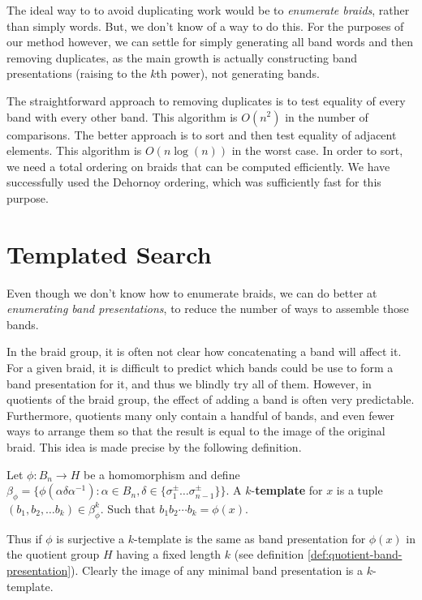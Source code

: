 \documentclass[12pt]{thesis}
\begin{document}
The ideal way to to avoid duplicating work would be to \textit{enumerate braids},
rather than simply words.
But, we don't know of a way to do this.
For the purposes of our method however, we can settle for simply
generating all band words and then removing duplicates, as the main growth is 
actually constructing band presentations (raising to the $k$th power), not generating bands.

The straightforward approach to removing duplicates is to test equality
of every band with every other band. 
This algorithm is $O(n^{2})$  in the number of comparisons.
The better approach is to sort and then test equality of adjacent elements.
This algorithm is $O(n \log(n))$ in the worst case.
In order to sort, we need a total ordering on braids that can be computed efficiently.
We have successfully used the Dehornoy ordering, which was sufficiently fast for this purpose.

\section{Templated Search}

Even though we don't know how to enumerate braids,
we can do better at \textit{enumerating band presentations},
to reduce the number of ways to assemble those bands.

In the braid group, it is often not clear how concatenating a band will affect it.
For a given braid, it is difficult to predict which bands could be use to form a band presentation for it,
and thus we blindly try all of them.
However, in quotients of the braid group, the effect of adding a band is often very predictable.
Furthermore, quotients many only contain a handful of bands,
and even fewer ways to arrange them so that the result is equal to the image of the original braid.
This idea is made precise by the following definition.

\begin{definition}
     Let $\phi \colon B_{n} \rightarrow H$ be a homomorphism
     and define $\beta_{\phi} = \{ \phi(\alpha \delta \alpha^{-1}) \colon \alpha \in B_{n}, \delta \in \{\sigma_{1}^{\pm} \ldots \sigma_{n-1}^{\pm} \} \}$.
     A $k$-\textbf{template} for $x$ 
     is a tuple $(b_{1}, b_{2}, \ldots b_{k}) \in \beta_{\phi}^{k}$.
     Such that $b_{1}b_{2} \cdots b_{k} = \phi(x)$.
\end{definition}

Thus if $\phi$ is surjective
a $k$-template is the same as band presentation for $\phi(x)$ in the quotient
group $H$ having a fixed length $k$ (see definition \ref{def:quotient-band-presentation}).
Clearly the image of any minimal band presentation is a $k$-template.
\end{document}
